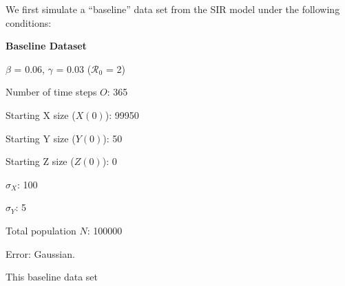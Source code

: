 \message{ !name(draft_v13.tex)}\documentclass[12pt]{article}
\newcommand{\rr}{\ensuremath{\mathcal{R}_0}}
\begin{document}
We first simulate a ``baseline'' data set from the SIR model under the following conditions: 

\textbf{Baseline Dataset}
\begin{center}
	
	$\beta$ = 0.06, $\gamma$ = 0.03 ($\rr$ = 2)
	
	Number of time steps $O$: 365
	
	Starting X size ($X(0)$): 99950
	
	Starting Y size ($Y(0)$): 50
	
	Starting Z size ($Z(0)$): 0 
	
	$\sigma_X$: 100
	
	$\sigma_Y$: 5
	
	Total population $N$: 100000

        Error: Gaussian.
	
      \end{center}

This baseline data set      


\end{document}
